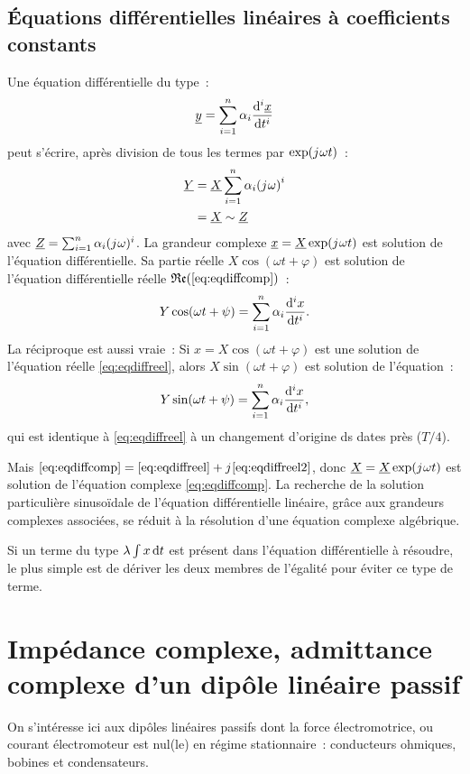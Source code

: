 \subsection{Équations différentielles linéaires à coefficients constants}
Une équation différentielle du type~:
\begin{equation}
  \label{eq:eqdiffcomp}
  \yc = \sum_{i=1}^n \alpha_i \derivedn{\xc}{t}{i}
\end{equation}
peut s'écrire, après division de tous les termes par \(\exp(\ju\omega 
t)\)~:
\begin{align}
  \Yc &= \Xc \sum_{i=1}^n \alpha_i {(\ju \omega)}^i\\
  &= \Xc \sim \Zc
\end{align}
avec \(\Zc = \sum_{i=1}^n \alpha_i (\ju \omega)^i\). La grandeur 
complexe \(\xc = \Xc\exp(\ju\omega t)\) est solution de l'équation 
différentielle. Sa partie réelle \(X\cos(\omega t+\varphi)\) est 
solution de l'équation différentielle réelle 
\(\Re(\eqref{eq:eqdiffcomp})\)~:
\begin{equation}
  \label{eq:eqdiffreel}
  Y\cos(\omega t +\psi) = \sum_{i=1}^n \alpha_i \derivedn{x}{t}{i}.
\end{equation}
La réciproque est aussi vraie~: Si \(x=X\cos(\omega t +\varphi)\) est 
une solution de l'équation réelle \eqref{eq:eqdiffreel}, alors 
\(X\sin(\omega t +\varphi)\) est solution de l'équation~:
\begin{equation}
  \label{eq:eqdiffreel2}
  Y\sin(\omega t +\psi) = \sum_{i=1}^n \alpha_i \derivedn{x}{t}{i},
\end{equation}
qui est identique à \eqref{eq:eqdiffreel} à un changement d'origine ds 
dates près (\(T/4\)).

Mais \(\eqref{eq:eqdiffcomp} = \eqref{eq:eqdiffreel} + \ju 
\eqref{eq:eqdiffreel2}\), donc \(\Xc = \Xc \exp(\ju\omega t)\) est 
solution de l'équation complexe \eqref{eq:eqdiffcomp}. La recherche de 
la solution particulière sinusoïdale de l'équation différentielle 
linéaire, grâce aux grandeurs complexes associées, se réduit à la 
résolution d'une équation complexe algébrique.

Si un terme du type \(\lambda \int x \diff{}t\) est présent dans 
l'équation différentielle à résoudre, le plus simple est de dériver les 
deux membres de l'égalité pour éviter ce type de terme.
\section{Impédance complexe, admittance complexe d'un dipôle linéaire passif}%
On s'intéresse ici aux dipôles linéaires passifs dont la force 
électromotrice, ou courant électromoteur est nul(le) en régime 
stationnaire~: conducteurs ohmiques, bobines et condensateurs.

